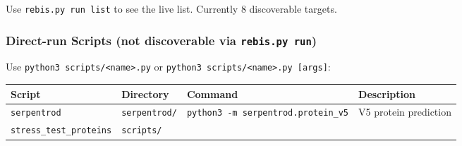 \documentclass[12pt,a4paper]{article}
\begin{document}
Use \texttt{rebis.py\ run\ list} to see the live list. Currently 8
discoverable targets.

\hypertarget{direct-run-scripts-not-discoverable-via-rebis.py-run}{%
\subsubsection{\texorpdfstring{Direct-run Scripts (not discoverable via
\texttt{rebis.py\ run})}{Direct-run Scripts (not discoverable via rebis.py run)}}\label{direct-run-scripts-not-discoverable-via-rebis.py-run}}

Use \texttt{python3\ scripts/\textless{}name\textgreater{}.py} or
\texttt{python3\ scripts/\textless{}name\textgreater{}.py\ {[}args{]}}:

\begin{longtable}[]{@{}llll@{}}
\toprule
\begin{minipage}[b]{0.17\columnwidth}\raggedright
Script\strut
\end{minipage} & \begin{minipage}[b]{0.24\columnwidth}\raggedright
Directory\strut
\end{minipage} & \begin{minipage}[b]{0.19\columnwidth}\raggedright
Command\strut
\end{minipage} & \begin{minipage}[b]{0.28\columnwidth}\raggedright
Description\strut
\end{minipage}\tabularnewline
\midrule
\endhead
\begin{minipage}[t]{0.17\columnwidth}\raggedright
\texttt{serpentrod}\strut
\end{minipage} & \begin{minipage}[t]{0.24\columnwidth}\raggedright
\texttt{serpentrod/}\strut
\end{minipage} & \begin{minipage}[t]{0.19\columnwidth}\raggedright
\texttt{python3\ -m\ serpentrod.protein\_v5}\strut
\end{minipage} & \begin{minipage}[t]{0.28\columnwidth}\raggedright
V5 protein prediction\strut
\end{minipage}\tabularnewline
\begin{minipage}[t]{0.17\columnwidth}\raggedright
\texttt{stress\_test\_proteins}\strut
\end{minipage} & \begin{minipage}[t]{0.24\columnwidth}\raggedright
\texttt{scripts/}\strut
\end{minipage} & \begin{minipage}[t]{0.19\columnwidth}\raggedright

\end{minipage}
\end{longtable}
\end{document}
